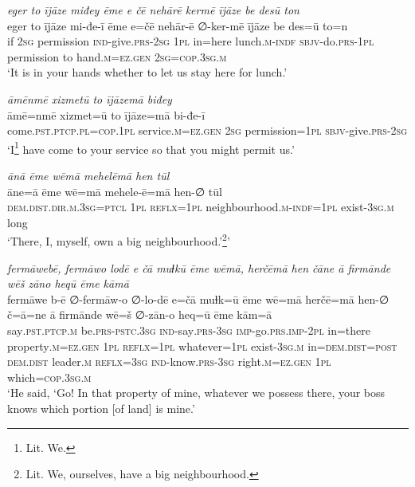 \ea \label{PM.14}
\textit{eger to ījāze miđey ēme e čē nehārē kermē ījāze be desū ton} \\ 
\gll eger to ījāze mi-đe-ī ēme e=čē nehār-ē ∅-ker-mē ījāze be des=ū to=n \\ 
 if \textsc{2sg} permission \textsc{ind-}give\textsc{.prs}-\textsc{2sg} \textsc{1pl} in=here lunch\textsc{.m}\textsc{-indf} \textsc{sbjv-}do\textsc{.prs}\textsc{-1pl} permission to hand\textsc{.m}\textsc{\textsc{=ez.gen}} \textsc{2sg}\textsc{=cop}\textsc{.3sg}\textsc{.m} \\ 
\glt `It is in your hands whether to let us stay here for lunch.'
\z 
 
\ea \label{PM.15}
\textit{āmēnmē xizmetū to ījāzemā biđey} \\ 
\gll āmē=nmē xizmet=ū to ījāze=mā bi-đe-ī \\ 
 come\textsc{.pst}\textsc{.ptcp}\textsc{.pl}\textsc{=cop}\textsc{.1pl} service\textsc{.m}\textsc{\textsc{=ez.gen}} \textsc{2sg} permission\textsc{=1pl} \textsc{sbjv-}give\textsc{.prs}-\textsc{2sg} \\ 
\glt `I\footnote{Lit. We.} have come to your service so that you might permit us.'
\z 
 
\ea \label{PM.17}
\textit{ānā ēme wēmā mehelēmā hen tūl} \\ 
\gll āne=ā ēme wē=mā mehele-ē=mā hen-∅ tūl \\ 
 \textsc{dem.dist}\textsc{.dir}\textsc{.m}\textsc{.3sg}=\textsc{ptcl} \textsc{1pl} \textsc{reflx}\textsc{=1pl} neighbourhood\textsc{.m}\textsc{-indf}\textsc{=1pl} exist\textsc{-3sg}\textsc{.m} long \\ 
\glt `There, I, myself, own a big neighbourhood.’\footnote{Lit. We, ourselves, have a big neighbourhood.}'
\z 
 
\ea \label{PM.20}
\textit{fermāwebē, fermāwo lodē e čā muɫkū ēme wēmā, herčēmā hen čāne ā firmānde wēš zāno heqū ēme kāmā} \\ 
\gll fermāwe b-ē ∅-fermāw-o ∅-lo-dē e=čā muɫk=ū ēme wē=mā herčē=mā hen-∅ č=ā=ne ā firmānde wē=š ∅-zān-o heq=ū ēme kām=ā \\ 
 say\textsc{.pst}\textsc{.ptcp}\textsc{.m} be\textsc{.prs}\textsc{-pstc}\textsc{.3sg} \textsc{ind-}say\textsc{.prs}\textsc{-3sg} \textsc{imp-}go\textsc{.prs}.\textsc{imp-}\textsc{2pl} in=there property\textsc{.m}\textsc{\textsc{=ez.gen}} \textsc{1pl} \textsc{reflx}\textsc{=1pl} whatever\textsc{=1pl} exist\textsc{-3sg}\textsc{.m} in=\textsc{dem.dist}\textsc{=\textsc{post}} \textsc{dem.dist} leader\textsc{.m} \textsc{reflx}\textsc{=3sg} \textsc{ind-}know\textsc{.prs}\textsc{-3sg} right\textsc{.m}\textsc{\textsc{=ez.gen}} \textsc{1pl} which\textsc{=cop}\textsc{.3sg}\textsc{.m} \\ 
\glt `He said, ‘Go! In that property of mine, whatever we possess there, your boss knows which portion [of land] is mine.'
\z 
 
